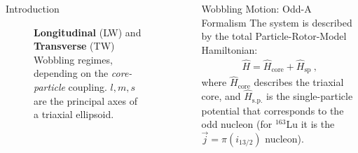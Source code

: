 \documentclass[final]{beamer}
\newlength{\sepwidth}
\newlength{\colwidth}
\newcommand{\separatorcolumn}{\begin{column}{\sepwidth}\end{column}}
\begin{document}
\begin{frame}[t]
\begin{columns}[t]
\begin{column}{\colwidth}
\begin{block}{Introduction}
\begin{figure}
      \caption{\textbf{Longitudinal} (LW) and \textbf{Transverse} (TW) Wobbling regimes, depending on the \emph{core-particle} coupling. $l,m,s$ are the principal axes of a triaxial ellipsoid.}
      \label{tw-lw-wobbling}
  \end{figure}
  \end{block}
\end{column}
\separatorcolumn
\begin{column}{\colwidth}
  \begin{block}{Wobbling Motion: Odd-A Formalism}
The system is described by the total Particle-Rotor-Model Hamiltonian:
\begin{align}
    \hat{H}=\hat{H}_\text{core}+\hat{H}_\text{sp}\ ,
\end{align}
where $\hat{H}_\text{core}$ describes the triaxial core, and $\hat{H}_\text{s.p.}$ is the single-particle potential that corresponds to the odd nucleon (for $^{163}$Lu it is the $\vec{j}=\pi(i_{13/2})$ nucleon).


\end{block}
\end{column}
\end{columns}
\end{frame}
\end{document}
